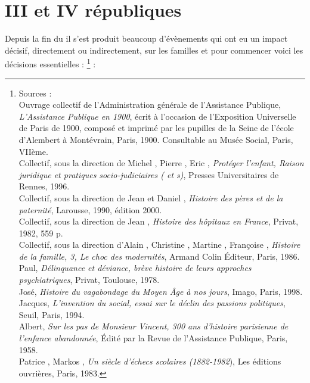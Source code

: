 

\chapter{III\ieme{} et IV\ieme{} républiques}


 Depuis la fin du  il s'est produit beaucoup d'évènements qui ont eu un impact décisif, directement ou indirectement, sur les familles et pour commencer voici les décisions essentielles :
\footnote{Sources :
\\Ouvrage collectif de l'Administration générale de l'Assistance Publique, \emph{L'Assistance Publique en 1900}, écrit à l'occasion de l'Exposition Universelle de Paris de 1900, composé et imprimé par les pupilles de la Seine de l'école d'Alembert à Montévrain, Paris, 1900. Consultable au Musée Social, Paris, VIIème.
\\Collectif, sous la direction de Michel , Pierre , Eric , \emph{Protéger l'enfant, Raison juridique et pratiques socio-judiciaires ( et s)}, Presses Universitaires de Rennes, 1996.
\\Collectif, sous la direction de Jean  et Daniel , \emph{Histoire des pères et de la paternité}, Larousse, 1990, édition 2000.
\\Collectif, sous la direction de Jean , \emph{Histoire des hôpitaux en France}, Privat, 1982, 559 p.
\\Collectif, sous la direction d'Alain , Christine , Martine , Françoise , \emph{Histoire de la famille, 3, Le choc des modernités}, Armand Colin Éditeur, Paris, 1986.
\\ Paul, \emph{Délinquance et déviance, brève histoire de leurs approches psychiatriques}, Privat, Toulouse, 1978.
\\ José, \emph{Histoire du vagabondage du Moyen Âge à nos jours}, Imago, Paris, 1998.
\\ Jacques, \emph{L'invention du social, essai sur le déclin des passions politiques}, Seuil, Paris, 1994.
\\ Albert, \emph{Sur les pas de Monsieur Vincent, 300 ans d'histoire parisienne de l'enfance abandonnée}, Édité par la Revue de l'Assistance Publique, Paris, 1958.
\\Patrice {}, Markos , \emph{Un siècle d'échecs scolaires (1882-1982}), Les éditions ouvrières, Paris, 1983.}%
 :

